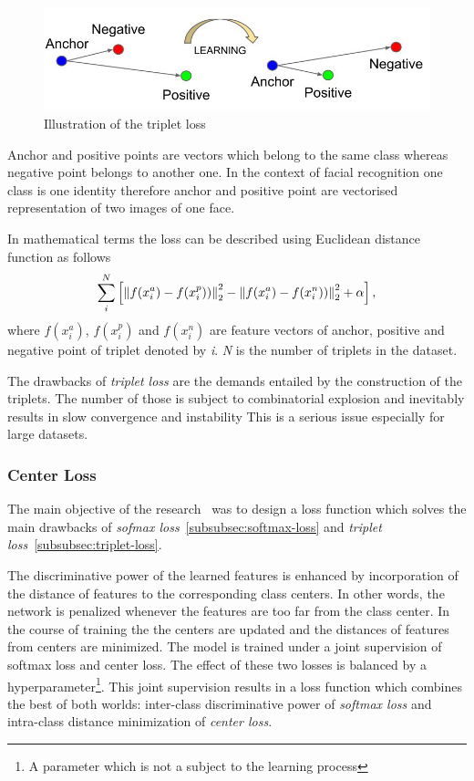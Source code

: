 \begin{figure}[H]
    \centering
    \includegraphics[width=\columnwidth]{images/face-recognition/tripletloss.jpeg}
    \caption{Illustration of the triplet loss~\cite{TripletLoss}}
    \label{fig:tripletloss}
\end{figure}

Anchor and positive points are vectors which belong to the same class whereas negative point belongs to another one.
In the context of facial recognition one class is one identity therefore anchor and positive point are vectorised
representation of two images of one face.

In mathematical terms the loss can be described using Euclidean distance function as follows
\begin{equation}
    \sum_{i}^{N} \left[ \left\lVert f(x_{i}^{a}) - f(x_{i}^{p}))\right\rVert^2_2
    - \left\lVert f(x_{i}^{a}) - f(x_{i}^{n}))\right\rVert^2_2 + \alpha \right],
\end{equation}
where $f(x_{i}^{a})$, $f(x_{i}^{p})$ and $f(x_{i}^{n})$ are feature vectors of anchor, positive and
negative point of triplet denoted by \textit{i}.
\textit{N} is the number of triplets in the dataset.

The drawbacks of \textit{triplet loss} are the demands entailed by the construction of the triplets.
The number of those is subject to combinatorial explosion and inevitably results in slow convergence and instability
This is a serious issue especially for large datasets.

\subsubsection{Center Loss}
The main objective of the research~\cite{CenterLoss} was to design a loss function which solves the main drawbacks of
\textit{sofmax loss}~\ref{subsubsec:softmax-loss} and \textit{triplet loss}~\ref{subsubsec:triplet-loss}.

The discriminative power of the learned features is enhanced by incorporation of the distance of features to the
corresponding class centers.
In other words, the network is penalized whenever the features are too far from the class center.
In the course of training the the centers are updated and the distances of features from centers are minimized.
The model is trained under a joint supervision of softmax loss and center loss.
The effect of these two losses is balanced by a hyperparameter\footnote{A parameter which is not a subject to the
learning process}.
This joint supervision results in a loss function which combines the best of both worlds:
inter-class discriminative power of \textit{softmax loss} and intra-class distance minimization of \textit{center loss}.

